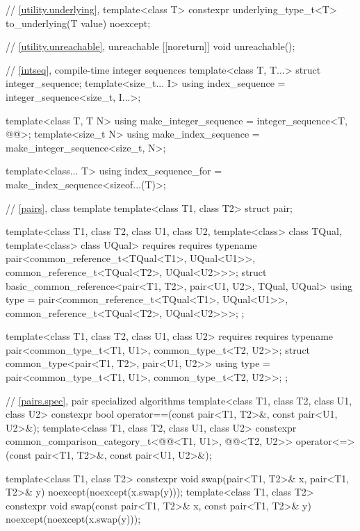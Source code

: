 \begin{codeblock}
{  // \ref{utility.underlying}, 
  template<class T>
    constexpr underlying_type_t<T> to_underlying(T value) noexcept;

  // \ref{utility.unreachable}, unreachable
  [[noreturn]] void unreachable();

  // \ref{intseq}, compile-time integer sequences%
%
%
  template<class T, T...>
    struct integer_sequence;
  template<size_t... I>
    using index_sequence = integer_sequence<size_t, I...>;

  template<class T, T N>
    using make_integer_sequence = integer_sequence<T, @\seebelow{}@>;
  template<size_t N>
    using make_index_sequence = make_integer_sequence<size_t, N>;

  template<class... T>
    using index_sequence_for = make_index_sequence<sizeof...(T)>;

  // \ref{pairs}, class template 
  template<class T1, class T2>
    struct pair;

  template<class T1, class T2, class U1, class U2,
           template<class> class TQual, template<class> class UQual>
    requires requires { typename pair<common_reference_t<TQual<T1>, UQual<U1>>,
                                      common_reference_t<TQual<T2>, UQual<U2>>>; }
  struct basic_common_reference<pair<T1, T2>, pair<U1, U2>, TQual, UQual> {
    using type = pair<common_reference_t<TQual<T1>, UQual<U1>>,
                      common_reference_t<TQual<T2>, UQual<U2>>>;
  };

  template<class T1, class T2, class U1, class U2>
    requires requires { typename pair<common_type_t<T1, U1>, common_type_t<T2, U2>>; }
  struct common_type<pair<T1, T2>, pair<U1, U2>> {
    using type = pair<common_type_t<T1, U1>, common_type_t<T2, U2>>;
  };

  // \ref{pairs.spec}, pair specialized algorithms
  template<class T1, class T2, class U1, class U2>
    constexpr bool operator==(const pair<T1, T2>&, const pair<U1, U2>&);
  template<class T1, class T2, class U1, class U2>
    constexpr common_comparison_category_t<@@<T1, U1>,
                                           @@<T2, U2>>
      operator<=>(const pair<T1, T2>&, const pair<U1, U2>&);

  template<class T1, class T2>
    constexpr void swap(pair<T1, T2>& x, pair<T1, T2>& y) noexcept(noexcept(x.swap(y)));
  template<class T1, class T2>
    constexpr void swap(const pair<T1, T2>& x, const pair<T1, T2>& y)
      noexcept(noexcept(x.swap(y)));

}
\end{codeblock}
